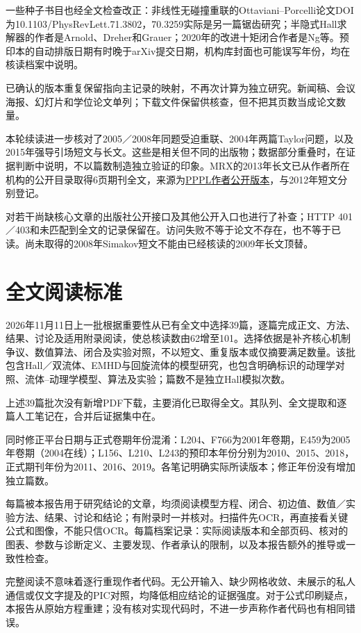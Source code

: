 \documentclass[UTF8,a4paper,11pt,openany,fontset=fandol]{ctexbook}
\begin{document}
一些种子书目也经全文检查改正：非线性无碰撞重联的Ottaviani--Porcelli论文DOI为10.1103/PhysRevLett.71.3802，70.3259实际是另一篇锯齿研究；半隐式Hall求解器的作者是Arnold、Dreher和Grauer；2020年的改进十矩闭合作者是Ng等。预印本的自动排版日期有时晚于arXiv提交日期，机构库封面也可能误写年份，均在核读档案中说明。

已确认的版本重复保留指向主记录的映射，不再次计算为独立研究。新闻稿、会议海报、幻灯片和学位论文单列；下载文件保留供核查，但不把其页数当成论文数量。

本轮续读进一步核对了2005／2008年同题受迫重联、2004年两篇Taylor问题，以及2015年强导引场短文与长文。这些是相关但不同的出版物；数据部分重叠时，在证据判断中说明，不以篇数制造独立验证的印象。MRX的2013年长文已从作者所在机构的公开目录取得6页期刊全文，来源为\href{https://w3.pppl.gov/~hji/paper/Tharp13.pdf}{PPPL作者公开版本}，与2012年短文分别登记。

对若干尚缺核心文章的出版社公开接口及其他公开入口也进行了补查；HTTP 401／403和未匹配到全文的记录保留在。访问失败不等于论文不存在，也不等于已读。尚未取得的2008年Simakov短文不能由已经核读的2009年长文顶替。

\section{全文阅读标准}
2026年11月11日上一批根据重要性从已有全文中选择39篇，逐篇完成正文、方法、结果、讨论及适用附录阅读，使总核读数由62增至101。选择依据是补齐核心机制争议、数值算法、闭合及实验对照，不以短文、重复版本或仅摘要满足数量。该批包含Hall／双流体、EMHD与回旋流体的模型研究，也包含明确标识的动理学对照、流体--动理学模型、算法及实验；篇数不是独立Hall模拟次数。

上述39篇批次没有新增PDF下载，主要消化已取得全文。其队列、全文提取和逐篇人工笔记在，合并后证据集中在。

同时修正平台日期与正式卷期年份混淆：L204、F766为2001年卷期，E459为2005年卷期（2004在线）；L156、L210、L243的预印本年份分别为2010、2015、2018，正式期刊年份为2011、2016、2019。各笔记明确实际所读版本；修正年份没有增加独立篇数。

每篇被本报告用于研究结论的文章，均须阅读模型方程、闭合、初边值、数值／实验方法、结果、讨论和结论；有附录时一并核对。扫描件先OCR，再直接看关键公式和图像，不能只信OCR。每篇档案记录：实际阅读版本和全部页码、核对的图表、参数与诊断定义、主要发现、作者承认的限制，以及本报告额外的推导或一致性检查。

完整阅读不意味着逐行重现作者代码。无公开输入、缺少网格收敛、未展示的私人通信或仅文字提及的PIC对照，均降低相应结论的证据强度。对于公式印刷疑点，本报告从原始方程重建；没有核对实现代码时，不进一步声称作者代码也有相同错误。
\end{document}
